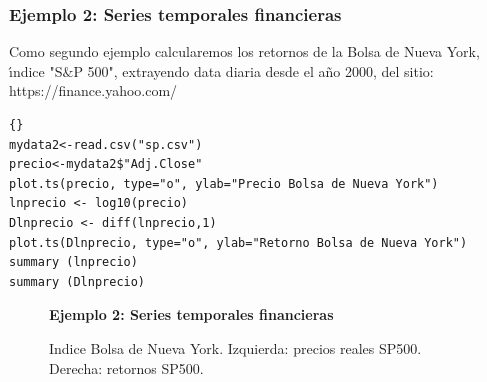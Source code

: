 \subsubsection{Ejemplo 2: Series temporales financieras}
Como segundo ejemplo calcularemos los retornos de la Bolsa de Nueva York, \'\i{}ndice "S$\&$P 500", extrayendo data diaria desde el a\~no 2000, del sitio: https://finance.yahoo.com/\\

\begin{lstlisting}[title={‘Código R precio de la Bolsa de Nueva York.’},basicstyle=\ttfamily]{}
mydata2<-read.csv("sp.csv")
precio<-mydata2$"Adj.Close"
plot.ts(precio, type="o", ylab="Precio Bolsa de Nueva York")
lnprecio <- log10(precio)
Dlnprecio <- diff(lnprecio,1)
plot.ts(Dlnprecio, type="o", ylab="Retorno Bolsa de Nueva York")
summary (lnprecio)
summary (Dlnprecio)
\end{lstlisting}

\begin{figure}[H]{}
\centering
\textbf{Ejemplo 2: Series temporales financieras}\par\medskip
{}
\caption{Indice Bolsa de Nueva York. Izquierda: precios reales SP500. Derecha: retornos SP500.}\label{figura2}
\end{figure}

